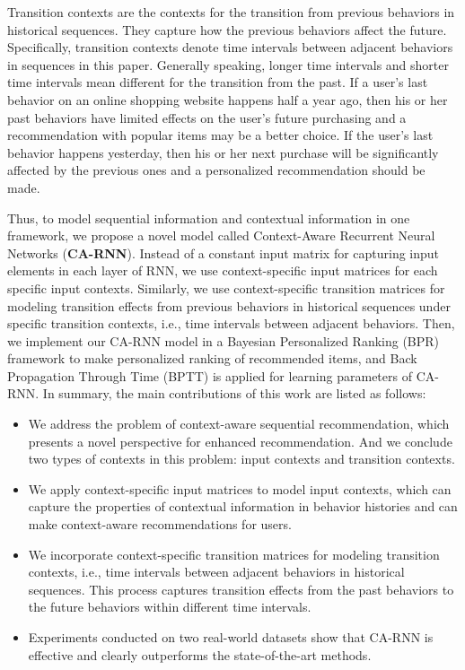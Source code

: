 \documentclass[conference]{IEEEtran}
\begin{document}
Transition contexts are the contexts for the transition from previous behaviors in historical sequences. They capture how the previous behaviors affect the future. Specifically, transition contexts denote time intervals between adjacent behaviors in sequences in this paper. Generally speaking, longer time intervals and shorter time intervals mean different for the transition from the past. If a user's last behavior on an online shopping website happens half a year ago, then his or her past behaviors have limited effects on the user's future purchasing and a recommendation with popular items may be a better choice. If the user's last behavior happens yesterday, then his or her next purchase will be significantly affected by the previous ones and a personalized recommendation should be made.

Thus, to model sequential information and contextual information in one framework, we propose a novel model called Context-Aware Recurrent Neural Networks (\textbf{CA-RNN}). Instead of a constant input matrix for capturing input elements in each layer of RNN, we use context-specific input matrices for each specific input contexts. Similarly, we use context-specific transition matrices for modeling transition effects from previous behaviors in historical sequences under specific transition contexts, i.e., time intervals between adjacent behaviors. Then, we implement our CA-RNN model in a Bayesian Personalized Ranking (BPR) \cite{rendle2009bpr} framework to make personalized ranking of recommended items, and Back Propagation Through Time (BPTT) \cite{rumelhart1988learning} is applied for learning parameters of CA-RNN. In summary, the main contributions of this work are listed as follows:

\begin{itemize}
\item
We address the problem of context-aware sequential recommendation, which presents a novel perspective for enhanced recommendation. And we conclude two types of contexts in this problem: input contexts and transition contexts.

\item
We apply context-specific input matrices to model input contexts, which can capture the properties of contextual information in behavior histories and can make context-aware recommendations for users.

\item
We incorporate context-specific transition matrices for modeling transition contexts, i.e., time intervals between adjacent behaviors in historical sequences. This process captures transition effects from the past behaviors to the future behaviors within different time intervals.

\item
Experiments conducted on two real-world datasets show that CA-RNN is effective and clearly outperforms the state-of-the-art methods.

\end{itemize}
\end{document}
